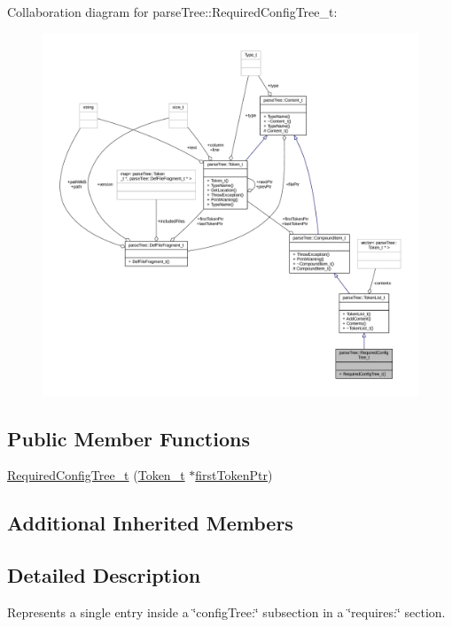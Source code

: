 Collaboration diagram for parse\+Tree\+:\+:Required\+Config\+Tree\+\_\+t\+:
\nopagebreak
\begin{figure}[H]
\begin{center}
\leavevmode
\includegraphics[width=350pt]{structparse_tree_1_1_required_config_tree__t__coll__graph}
\end{center}
\end{figure}
\subsection*{Public Member Functions}
\begin{DoxyCompactItemize}
\item 
\hyperlink{structparse_tree_1_1_required_config_tree__t_a569cc749097a42f0214e405af5ba9c28}{Required\+Config\+Tree\+\_\+t} (\hyperlink{structparse_tree_1_1_token__t}{Token\+\_\+t} $\ast$\hyperlink{structparse_tree_1_1_compound_item__t_a587020c943e760cb0152dd8cd31e21ef}{first\+Token\+Ptr})
\end{DoxyCompactItemize}
\subsection*{Additional Inherited Members}


\subsection{Detailed Description}
Represents a single entry inside a \char`\"{}config\+Tree\+:\char`\"{} subsection in a \char`\"{}requires\+:\char`\"{} section. 

